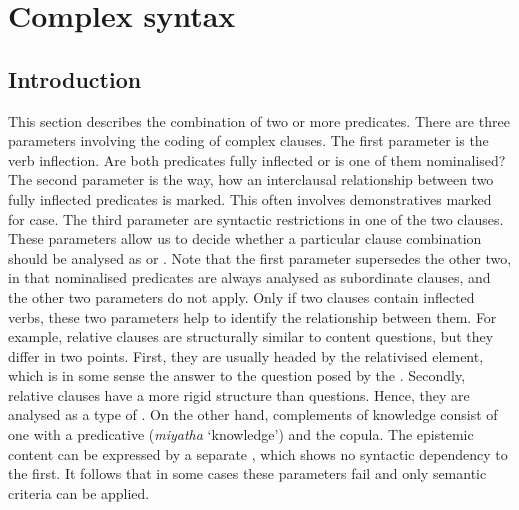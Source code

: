 
\chapter{Complex syntax} \label{cha:interclausalsyntax}

\section{Introduction}\label{interclausintro}

This section describes the combination of two or more predicates. There are three parameters involving the coding of complex clauses. The first parameter is the verb inflection. Are both predicates fully inflected or is one of them nominalised? The second parameter is the way, how an interclausal relationship between two fully inflected predicates is marked. This often involves demonstratives marked for case. The third parameter are syntactic restrictions in one of the two clauses. These parameters allow us to decide whether a particular clause combination should be analysed as  or . Note that the first parameter supersedes the other two, in that nominalised predicates are always analysed as subordinate clauses, and the other two parameters do not apply. Only if two clauses contain inflected verbs, these two parameters help to identify the relationship between them. For example, relative clauses are structurally similar to content questions, but they differ in two points. First, they are usually headed by the relativised element, which is in some sense the answer to the question posed by the . Secondly, relative clauses have a more rigid structure than questions. Hence, they are analysed as a type of . On the other hand, complements of knowledge consist of one  with a predicative  (\emph{miyatha} `knowledge') and the copula. The epistemic content can be expressed by a separate , which shows no syntactic dependency to the first. It follows that in some cases these parameters fail and only semantic criteria can be applied.%

